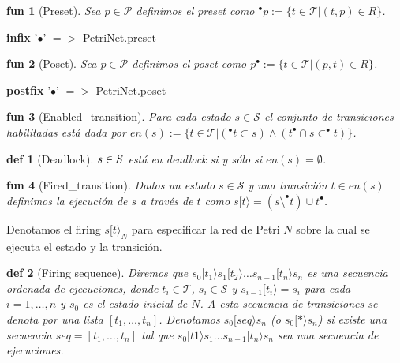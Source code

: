 \documentclass{article}
\newtheorem{defi}{def}
\newtheorem{fun}{fun}
\newcommand{\Tr}{\mathcal{T}}
\newcommand{\St}{\mathcal{S}}
\newcommand{\pres}[1]{^{\bullet}{#1}}
\newcommand{\pos}[1]{{#1}^{\bullet}}
\begin{document}
\begin{fun}[Preset] \rm{Sea $p\in \mathcal P$ definimos el preset como} $^{\bullet}p := \{t\in \mathcal T|(t,p)\in R\}$.
\end{fun}

\textbf{infix} '$\bullet$' $=>$ PetriNet.preset

\begin{fun}[Poset] \rm{Sea $p\in \mathcal P$ definimos el poset como} $ p^{\bullet} := \{t\in \mathcal T|(p,t)\in R\}$.
\end{fun}


\textbf{postfix} '$\bullet$' $=>$ PetriNet.poset


\begin{fun}[Enabled\_transition] \rm{Para cada estado $s\in \mathcal S$ el conjunto de transiciones habilitadas está dada por} $en(s) := \{t \in \Tr | (\pres{t} \subset s) \wedge (\pos{t}\cap s\subset \pres{t})\}$.
\end{fun}

\begin{defi}[Deadlock] $s\in \mathcal \St$\rm{ está en deadlock si y sólo si } $en(s)=\emptyset$.

\end{defi}


\begin{fun}[Fired\_transition]
  \rm{Dados un estado $s\in \St$ y una transición $t\in en(s)$ definimos la ejecución de $s$ a través de $t$ como $s[t\rangle =(s\setminus ^{\bullet}t)\cup t^{\bullet}$}.
\end{fun}

Denotamos el firing $s[t\rangle_N$ para especificar la red de Petri $N$ sobre la cual se ejecuta el estado y la transición.

\begin{defi}[Firing sequence]\rm{Diremos que $s_0[t_1\rangle s_1[t_2\rangle\dots s_{n-1}[t_n\rangle s_n$ es una secuencia ordenada de ejecuciones, donde $t_i\in\Tr$, $s_i\in\St$ y $s_{i-1}[t_i\rangle = s_i$ para cada $i=1,\dots,n$ y $s_0$ es el estado inicial de $N$.
  A esta secuencia de transiciones se denota por una lista $[t_1,\dots,t_n]$.
  Denotamos $s_0[seq\rangle s_n$ (o $s_0[*\rangle s_n$) si existe una secuencia $seq=[t_1,\dots,t_n]$ tal que $s_0[t1\rangle s_1\dots  s_{n-1}[t_n\rangle s_n$ sea una secuencia de ejecuciones.}
\end{defi}
\end{document}
